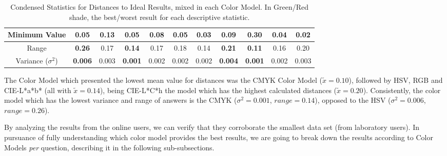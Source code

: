 \begin{table}[htbp]
{\begin{tabular}{@{}ccccccccccc@{}}
    \multicolumn{1}{c|}{Minimum Value}                                                 & 0.05  & 0.13       & 0.05                                   & 0.08  & \multicolumn{1}{c|}{0.05}                                  & 0.03                                  & 0.09       & 0.30                                   & 0.04                                  & \multicolumn{1}{c|}{0.02}  \\ \midrule
    \multicolumn{1}{c|}{Range}                                                         & \cellcolor[HTML]{FD6864}\textbf{0.26}  & 0.17       & \cellcolor[HTML]{32CB00}\textbf{0.14}  & 0.17  & \multicolumn{1}{c|}{0.18}                                  & 0.14                                  & \cellcolor[HTML]{FD6864}\textbf{0.21}       & \cellcolor[HTML]{32CB00}\textbf{0.11}  & 0.16                                  & \multicolumn{1}{c|}{0.20}  \\ \midrule
    \multicolumn{1}{c|}{Variance ($\sigma^2$)}                                                      & \cellcolor[HTML]{FD6864}\textbf{0.006} & 0.003      & \cellcolor[HTML]{32CB00}\textbf{0.001} & 0.002 & \multicolumn{1}{c|}{0.002}                                 & 0.002                                 & \cellcolor[HTML]{FD6864}\textbf{0.004}      & \cellcolor[HTML]{32CB00}\textbf{0.001} & 0.002                                 & \multicolumn{1}{c|}{0.003} \\ \bottomrule
  \end{tabular}}
  \caption[Condensed Statistics for Distances to Ideal Results, mixed in each Color Model.]{Condensed Statistics for Distances to Ideal Results, mixed in each Color Model. In Green/Red shade, the best/worst result for each descriptive statistic.}
  \label{table:colormodels_distances_labonline_statistics}
\end{table}
%
The Color Model which presented the lowest mean value for distances was the CMYK Color Model ($\tilde{x} = 0.10$), followed by HSV, RGB and CIE-L*a*b* (all with $\tilde{x} = 0.14$), being
CIE-L*C*h the model which has the highest calculated distances ($\tilde{x} = 0.20$). Consistently, the color model which has the lowest variance and range of answers is the CMYK ($\sigma^2 = 0.001$,
$range = 0.14$), opposed to the HSV ($\sigma^2 = 0.006$, $range = 0.26$). \par
%
By analyzing the results from the online users, we can verify that they corroborate the smallest data set (from laboratory users). In pursuance of fully understanding which color model provides the best results,
we are going to break down the results according to Color Models \emph{per} question, describing it in the following sub-subsections. \par
%
%
